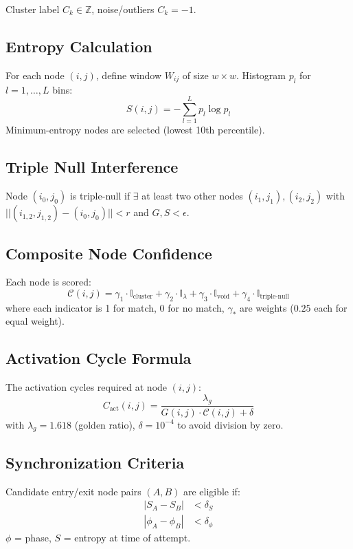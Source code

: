 \documentclass[12pt]{article}
\begin{document}
Cluster label $C_k \in \mathbb{Z}$, noise/outliers $C_k = -1$.

\subsection{Entropy Calculation}
For each node $(i,j)$, define window $W_{ij}$ of size $w \times w$.  
Histogram $p_l$ for $l=1,\dots,L$ bins:
\begin{equation}
S(i,j) = -\sum_{l=1}^L p_l \log p_l
\end{equation}
Minimum-entropy nodes are selected (lowest 10th percentile).

\subsection{Triple Null Interference}
Node $(i_0,j_0)$ is triple-null if $\exists$ at least two other nodes $(i_1,j_1), (i_2,j_2)$ with $|| (i_{1,2}, j_{1,2}) - (i_0, j_0) || < r$ and $G, S < \epsilon$.

\subsection{Composite Node Confidence}
Each node is scored:
\begin{equation}
\mathcal{C}(i,j) = \gamma_1 \cdot \mathbb{I}_{\text{cluster}} + \gamma_2 \cdot \mathbb{I}_{\lambda} + \gamma_3 \cdot \mathbb{I}_{\text{void}} + \gamma_4 \cdot \mathbb{I}_{\text{triple-null}}
\end{equation}
where each indicator is 1 for match, 0 for no match, $\gamma_\ast$ are weights ($0.25$ each for equal weight).

\subsection{Activation Cycle Formula}
The activation cycles required at node $(i,j)$:
\begin{equation}
C_{\text{act}}(i,j) = \frac{\lambda_g}{G(i,j) \cdot \mathcal{C}(i,j) + \delta}
\end{equation}
with $\lambda_g = 1.618$ (golden ratio), $\delta = 10^{-4}$ to avoid division by zero.

\subsection{Synchronization Criteria}
Candidate entry/exit node pairs $(A,B)$ are eligible if:
\begin{align}
|S_A - S_B| &< \delta_S \\
|\phi_A - \phi_B| &< \delta_\phi
\end{align}
$\phi$ = phase, $S$ = entropy at time of attempt.
\end{document}
